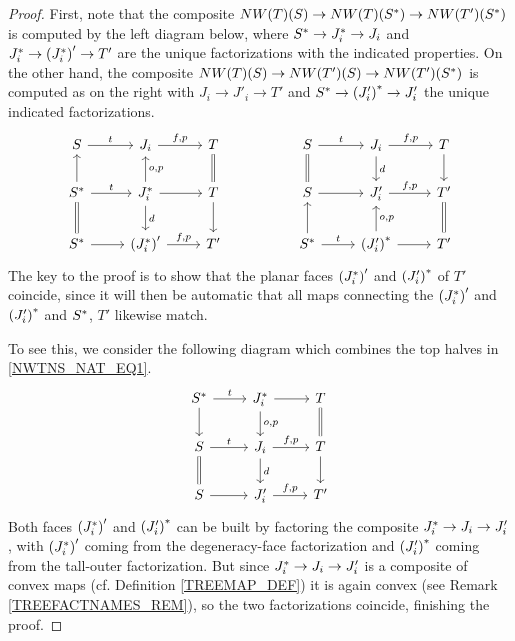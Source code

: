 \documentclass[a4paper,10pt]{article}%
\numberwithin{equation}{section}
\numberwithin{figure}{section}
\theoremstyle{definition} %
\begin{document}
\begin{proof}
	First, note that the composite
	$NW(T)({S})
	\to 
	NW(T)({S^{\**}})
	\to 
	NW(T')({S^{\**}})$
	is computed by the left diagram below,
	where
	$S^{\**} \to J^{\**}_i \to J_i$
	and 
	$J^{\**}_i \to \left(J_i^{\**}\right)' \to T'$
	are the unique factorizations with the indicated properties.
	On the other hand, the composite
	$NW(T)(S)
	\to 
	NW(T')(S)
	\to 
	NW(T')(S^{\**})$
	is computed as on the right
	with 
	$J_i \to J'_i \to T'$ and
	$S^{\**} \to \left(J_i'\right)^{\**} \to J'_i$
	the unique indicated factorizations.
\begin{equation}\label{NWTNS_NAT_EQ1}
\begin{tikzcd}
	S \ar{r}{t} 
&
	J_i \ar{r}{f,p} 
&
	T \ar[equal]{d}
&&%
	S \ar{r}{t} \ar[equal]{d}
&
	J_i \ar{r}{f,p} \ar{d}{d}
&
	T \ar{d}
\\
	S^{\**} \ar{u} \ar{r}{t} \ar[equal]{d}
&
	J^{\**}_i \ar{r} \arrow{u}[swap]{o,p} \arrow{d}{d}
&
	T \ar{d}
&&%
	S \ar{r}
&
	J'_i \arrow{r}{f,p}
&
	T' \ar[equal]{d}
\\
	S^{\**} \ar{r}
&
	\left(J_i^{\**}\right)' \arrow{r}{f,p}
&
	T'
&&%
	S^{\**} \arrow{r}{t} \ar{u}
&
	\left(J_i'\right)^{\**} \ar{r} \arrow{u}[swap]{o,p}
&
	T'
\end{tikzcd}
\end{equation}
	The key to the proof is to show
	that the planar faces 
	$\left(J_i^{\**}\right)'$ and
	$\left(J_i'\right)^{\**}$
	of $T'$
	coincide, since it will then be automatic that all maps connecting the
	$\left(J_i^{\**}\right)'$ and
	$\left(J_i'\right)^{\**}$
	and $S^{\**}$, $T'$
	likewise match.

	To see this, we consider the following diagram
	which combines the top halves in \eqref{NWTNS_NAT_EQ1}.
\begin{equation}
\begin{tikzcd}
	S^{\**} \ar{r}{t} \ar{d}
&
	J^{\**}_i \ar{r} \ar{d}{o,p}
&
	T \ar[equal]{d}
\\
	S  \ar{r}{t} \ar[equal]{d}
&
	J_i \ar{r}{f,p}  \ar{d}{d}
&
	T \ar{d}
\\
	S \ar{r}
&
	J_i' \ar{r}{f,p}
&
	T'
\end{tikzcd}
\end{equation}
	Both faces  
	$\left(J^{\**}_i\right)'$ and 
	$\left(J'_i\right)^{\**}
	$
	can be built by factoring
	the composite 
	$J^{\**}_i \to J_i \to J_i'$,
	with 
	$\left(J^{\**}_i\right)'$ 
	coming from the 
	degeneracy-face factorization
	and 
	$\left(J'_i\right)^{\**}$
	coming from the 
	tall-outer factorization.
	But since 
	$J^{\**}_i \to J_i \to J_i'$
	is a composite of convex maps (cf. Definition \ref{TREEMAP_DEF})
    it is again convex (see Remark \ref{TREEFACTNAMES_REM}), 
	so the two factorizations coincide, 
	finishing the proof.
\end{proof}
\end{document}

